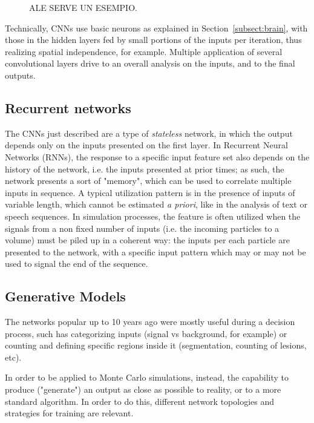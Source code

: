  \begin{figure}[h]
    \centering
    \hfill
     \caption{ALE SERVE UN ESEMPIO.}
     \label{fig:cnnsmedical}

\end{figure}


Technically, CNNs use basic neurons as explained in Section~\ref{subsect:brain}, with those in the hidden layers fed by small portions of the inputs per iteration, thus realizing spatial independence, for example. Multiple application of several convolutional layers drive to an overall analysis on the inputs, and to the final outputs.

\subsection{Recurrent networks}
The CNNs just described are a type of \emph{stateless} network, in which the output depends only on the inputs presented on the first layer. In Recurrent Neural Networks (RNNs), the response to a specific input feature set also depends on the history of the network, i.e. the inputs presented at prior times; as such, the network presents a sort of "memory", which can be used to correlate multiple inputs in sequence. A typical utilization pattern is in the presence of inputs of variable length, which cannot be estimated \emph{a priori}, like in the analysis of text or speech sequences. 
In simulation processes, the feature is often utilized when the signals from a non fixed number of inputs (i.e. the incoming particles to a volume) must be piled up in a coherent way: the inputs per each particle are presented to the network, with a specific input pattern which may or may not be used to signal the end of the sequence. %

\subsection{Generative Models}
\label{subseq:gan}
The networks popular up to 10 years ago were mostly useful during a decision process, such has categorizing inputs (signal vs background, for example) or counting and defining specific regions inside it (segmentation, counting of lesions, etc).

In order to be applied to Monte Carlo simulations, instead, the capability to produce ("generate") an output as close as possible to reality, or to a more standard algorithm. In order to do this, different network topologies and strategies for training are relevant.

